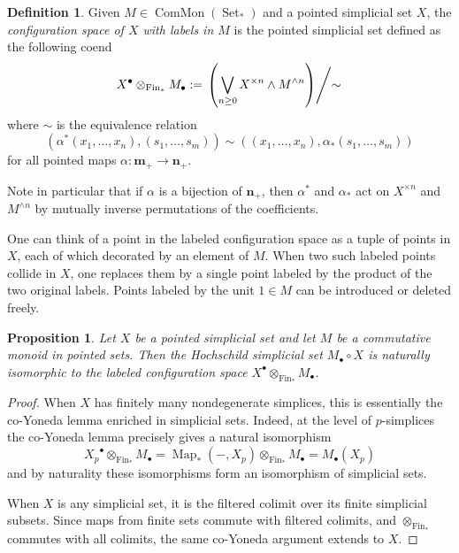 \documentclass[12pt]{article}
\newcommand{\ConfLabeled}[2]{{#1}^{\bullet}\otimes_{\Fin_{\ast}}{#2}_{\bullet}}
\newcommand{\n}[1][n]{\mathbf{#1}}
\newcommand{\FinPointedSet}[1]{\n[#1]_{+}}
\DeclareMathOperator{\Fin}{Fin}
\DeclareMathOperator{\Set}{Set}
\theoremstyle{plain}
\newtheorem{prop}[thm]{Proposition}
\theoremstyle{definition}
\newtheorem{defi}[thm]{Definition}
\theoremstyle{remark}
\begin{document}
\begin{defi}
    Given $M\in \operatorname{ComMon}(\Set_{\ast})$ and a pointed simplicial set $X$, the \emph{configuration space of $X$ with labels in $M$} is the pointed simplicial set defined as the following coend
    \begin{equation}
        \ConfLabeled{X}{M} := \left. \left(\bigvee_{n\geq 0} X^{\times n} \wedge M^{\wedge n}\right) \middle /\sim \right.
\end{equation}
where $\sim$ is the equivalence relation
\[
    (\alpha^{\ast}(x_1, \ldots, x_n), (s_1, \ldots, s_m))\sim((x_1,\ldots, x_n), \alpha_{\ast}(s_1,\ldots, s_m))
\]
for all pointed maps $\alpha\colon \FinPointedSet{m}\to\FinPointedSet{n}$.
\end{defi}
Note in particular that if $\alpha$ is a bijection of $\FinPointedSet{n}$, then $\alpha^{\ast}$ and $\alpha_{\ast}$ act on $X^{\times n}$ and $M^{\wedge n}$ by mutually inverse permutations of the coefficients.

One can think of a point in the labeled configuration space as a tuple of points in $X$, each of which decorated by an element of $M$. When two such labeled points collide in $X$, one replaces them by a single point labeled by the product of the two original labels. Points labeled by the unit $1\in M$ can be introduced or deleted freely.

\begin{prop}\label{prop:coend iso with Loday}
    Let $X$ be a pointed simplicial set %
    and let $M$ be a commutative monoid in pointed sets. Then the Hochschild simplicial set $M_{\bullet}\circ X$ 
    is naturally isomorphic to the labeled configuration space $\ConfLabeled{X}{M}$.
\end{prop}

\begin{proof}
    When $X$ has finitely many nondegenerate simplices, this is essentially the co-Yoneda lemma enriched in simplicial sets. Indeed, at the level of $p$-simplices the co-Yoneda lemma precisely gives a natural isomorphism 
    \begin{equation*}
        \ConfLabeled{X_p}{M} = \operatorname{Map}_{*}(-,X_p)\otimes_{\Fin_*} M_{\bullet} = M_{\bullet}(X_p)
    \end{equation*}
    and by naturality these isomorphisms form an isomorphism of simplicial sets. 
    
    When $X$ is any simplicial set, it is the filtered colimit over its finite simplicial subsets. Since maps from finite sets commute with filtered colimits, and $\otimes_{\Fin_*}$ commutes with all colimits, the same co-Yoneda argument extends to $X$. 
\end{proof}
\end{document}
